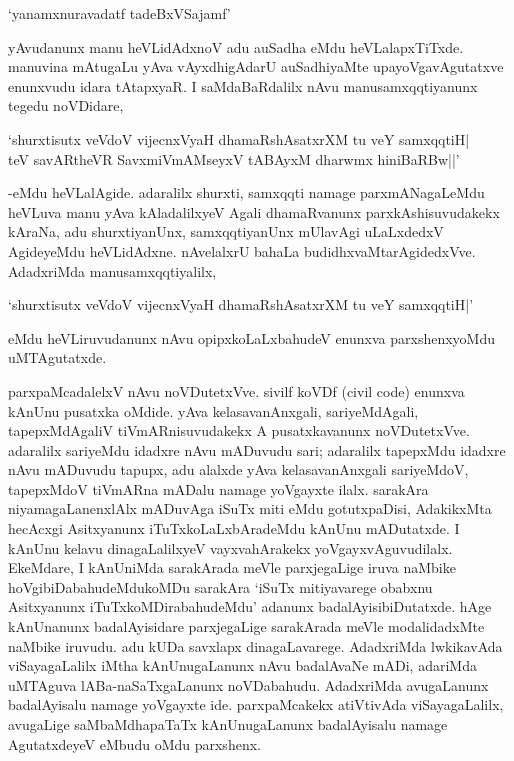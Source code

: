 \begin{shloka}
`yanamxnuravadatf tadeBxVSajamf'
\end{shloka}

\noindent yAvudanunx manu heVLidAdxnoV adu auSadha eMdu heVLalapxTiTxde. manuvina mAtugaLu yAva vAyxdhigAdarU auSadhiyaMte upayoVgavAgutatxve enunxvudu idara tAtapxyaR. I saMdaBaRdalilx nAvu manusamxqqtiyanunx tegedu noVDidare,

\begin{shloka}
`shurxtisutx veVdoV vijecnxVyaH dhamaRshAsatxrXM tu veY samxqqtiH|\\
teV savARtheVR SavxmiVmAMseyxV tABAyxM dharwmx hiniBaRBw||'
\end{shloka}
 
-eMdu heVLalAgide. adaralilx shurxti, samxqqti namage parxmANagaLeMdu heVLuva manu yAva kAladalilxyeV Agali dhamaRvanunx parxkAshisuvudakekx kAraNa, adu shurxtiyanUnx, samxqqtiyanUnx mUlavAgi uLaLxdedxV AgideyeMdu heVLidAdxne. nAvelalxrU bahaLa budidhxvaMtarAgidedxVve. AdadxriMda manusamxqqtiyalilx,

\begin{shloka} 
`shurxtisutx veVdoV vijecnxVyaH dhamaRshAsatxrXM tu veY samxqqtiH|'
\end{shloka}

\noindent eMdu heVLiruvudanunx nAvu opipxkoLaLxbahudeV enunxva parxshenxyoMdu uMTAgutatxde.

parxpaMcadalelxV nAvu noVDutetxVve. sivilf koVDf ({\rm civil code}) enunxva kAnUnu pusatxka oMdide. yAva kelasavanAnxgali, sariyeMdAgali, tapepxMdAgaliV tiVmARnisuvudakekx A pusatxkavanunx noVDutetxVve. adaralilx sariyeMdu idadxre nAvu mADuvudu sari; adaralilx tapepxMdu idadxre nAvu mADuvudu tapupx, adu alalxde yAva kelasavanAnxgali sariyeMdoV, tapepxMdoV tiVmARna mADalu namage yoVgayxte ilalx. sarakAra niyamagaLanenxlAlx mADuvAga iSuTx miti eMdu gotutxpaDisi, AdakikxMta hecAcxgi Asitxyanunx iTuTxkoLaLxbAradeMdu kAnUnu mADutatxde. I kAnUnu kelavu dinagaLalilxyeV vayxvahArakekx yoVgayxvAguvudilalx. EkeMdare, I kAnUniMda sarakArada meVle parxjegaLige iruva naMbike hoVgibiDabahudeMdukoMDu sarakAra `iSuTx mitiyavarege obabxnu Asitxyanunx iTuTxkoMDirabahudeMdu' adanunx badalAyisibiDutatxde. hAge kAnUnanunx badalAyisidare parxjegaLige sarakArada meVle modalidadxMte naMbike iruvudu. adu kUDa savxlapx dinagaLavarege. AdadxriMda lwkikavAda viSayagaLalilx iMtha kAnUnugaLanunx nAvu badalAvaNe mADi, adariMda uMTAguva lABa-naSaTxgaLanunx noVDabahudu. AdadxriMda avugaLanunx badalAyisalu namage yoVgayxte ide. parxpaMcakekx atiVtivAda viSayagaLalilx, avugaLige saMbaMdhapaTaTx kAnUnugaLanunx badalAyisalu namage AgutatxdeyeV eMbudu oMdu parxshenx.

